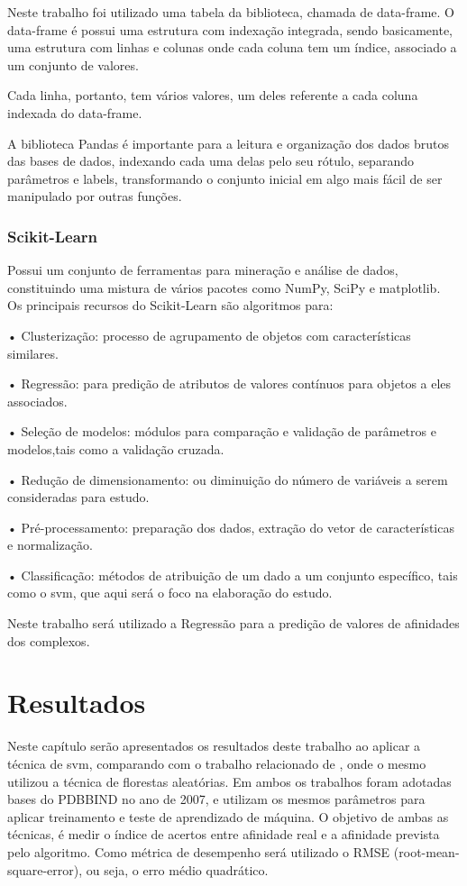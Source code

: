 \documentclass[tcc, capa]{texucpel}
\begin{document}
Neste trabalho foi utilizado uma tabela da biblioteca, chamada de data-frame. O data-frame é possui uma estrutura com indexação integrada, sendo basicamente, uma estrutura com linhas e colunas onde cada coluna tem um índice, associado a um conjunto de valores. 

Cada linha, portanto, tem vários valores, um deles referente a cada coluna indexada do data-frame.

A biblioteca Pandas é importante para a leitura e organização dos dados brutos das bases de dados, indexando cada uma delas pelo seu rótulo, separando parâmetros e labels, transformando o conjunto inicial em algo mais fácil de ser manipulado por outras funções.

\subsection{Scikit-Learn}
Possui um conjunto de ferramentas para mineração e análise de dados, constituindo uma mistura de vários pacotes como NumPy, SciPy e matplotlib. \\
Os principais recursos do Scikit-Learn são algoritmos para:

• Clusterização: processo de agrupamento de objetos com características similares.

• Regressão: para predição de atributos de valores contínuos para objetos a eles associados.

• Seleção de modelos: módulos para comparação e validação de parâmetros e modelos,tais como a validação cruzada.

• Redução de dimensionamento: ou diminuição do número de variáveis a serem consideradas para estudo.

• Pré-processamento: preparação dos dados, extração do vetor de características e  normalização.

• Classificação: métodos de atribuição de um dado a um conjunto específico, tais como o svm, que aqui será o foco na elaboração do estudo.

Neste trabalho será utilizado a Regressão para a predição de valores de afinidades dos complexos.

\chapter{Resultados}
Neste capítulo serão apresentados os resultados deste trabalho ao aplicar a técnica de svm, comparando com o trabalho relacionado de \citeauthor{ballester2010machine}, onde o mesmo utilizou a técnica de florestas aleatórias. 
Em ambos os trabalhos foram adotadas bases do PDBBIND no ano de 2007, e utilizam os mesmos parâmetros para aplicar treinamento e teste de aprendizado de máquina.
O objetivo de ambas as técnicas, é medir o índice de acertos entre afinidade real e a afinidade prevista pelo algoritmo.
Como métrica de desempenho será utilizado o RMSE (root-mean-square-error), ou seja, o erro médio quadrático.
\end{document}
